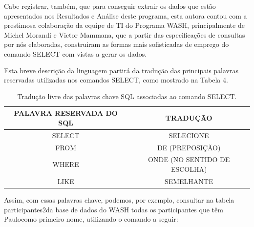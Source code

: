 \documentclass[
12pt,		%
openright,	%
twoside,  %
a4paper,			%
chapter=TITLE,		%
english,			%
french,				%
spanish,			%
brazil				%
]{USPSC-classe/USPSC}
\begin{document}
Cabe registrar, tamb\'em, que para conseguir extrair os dados que est\~ao apresentados nos Resultados e An\'alise deste programa, esta autora contou com a prestimosa colabora\c{c}\~ao da equipe de TI do Programa WASH, principalmente de Michel Morandi e Victor Mammana, que a partir das especifica\c{c}\~oes de consultas por n\'os elaboradas, construiram as formas mais sofisticadas de emprego do comando SELECT com vistas a gerar os dados.









Esta breve descri\c{c}\~ao da linguagem partir\'a da tradu\c{c}\~ao das principais palavras reservadas utilizadas nos comandos SELECT, como mostrado na Tabela 4.













\begin{table}[htb]
\tiny
\caption{\label{0faf6421bd5dff6b3cb8bedd3f0b4212f1150970}Tradu\c{c}\~ao livre das palavras chave SQL associadas ao comando SELECT.}

\centering
\begin{tabular}{|c|c|}
\hline
PALAVRA RESERVADA DO SQL  &  TRADU\c{C}\~AO \\
\hline
SELECT  &  SELECIONE \\
FROM  &  DE (PREPOSI\c{C}\~AO) \\
WHERE  &  ONDE (NO SENTIDO DE ESCOLHA) \\
LIKE  &  SEMELHANTE \\
\hline
\end{tabular}
\end{table}


Assim, com essas palavras chave, podemos, por exemplo, consultar na tabela \textquotedbl participantes2\textquotedbl   da base de dados do WASH todas os participantes que t\^em \textquotedbl Paulo\textquotedbl  como primeiro nome, utilizando o comando a seguir:










\noindent\begin{center}\mbox{\centering{}}\end{center}
\end{document}
